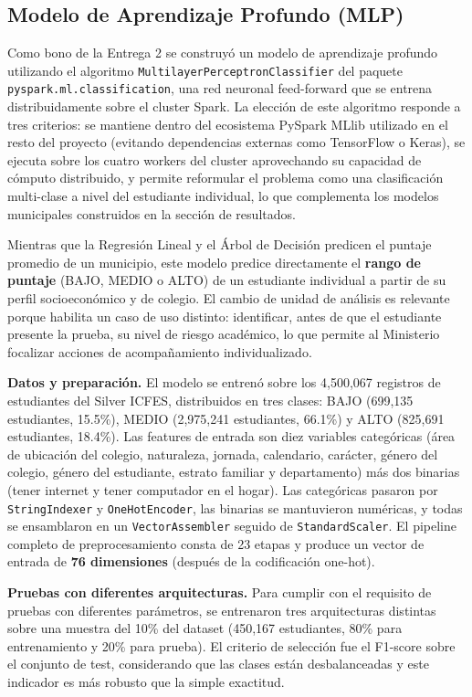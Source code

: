 \subsection{Modelo de Aprendizaje Profundo (MLP)}
Como bono de la Entrega 2 se construyó un modelo de aprendizaje profundo utilizando el algoritmo \texttt{MultilayerPerceptronClassifier} del paquete \texttt{pyspark.ml.classification}, una red neuronal feed-forward que se entrena distribuidamente sobre el cluster Spark. La elección de este algoritmo responde a tres criterios: se mantiene dentro del ecosistema PySpark MLlib utilizado en el resto del proyecto (evitando dependencias externas como TensorFlow o Keras), se ejecuta sobre los cuatro workers del cluster aprovechando su capacidad de cómputo distribuido, y permite reformular el problema como una clasificación multi-clase a nivel del estudiante individual, lo que complementa los modelos municipales construidos en la sección de resultados.

Mientras que la Regresión Lineal y el Árbol de Decisión predicen el puntaje promedio de un municipio, este modelo predice directamente el \textbf{rango de puntaje} (BAJO, MEDIO o ALTO) de un estudiante individual a partir de su perfil socioeconómico y de colegio. El cambio de unidad de análisis es relevante porque habilita un caso de uso distinto: identificar, antes de que el estudiante presente la prueba, su nivel de riesgo académico, lo que permite al Ministerio focalizar acciones de acompañamiento individualizado.

\textbf{Datos y preparación.} El modelo se entrenó sobre los 4,500,067 registros de estudiantes del Silver ICFES, distribuidos en tres clases: BAJO (699,135 estudiantes, 15.5\%), MEDIO (2,975,241 estudiantes, 66.1\%) y ALTO (825,691 estudiantes, 18.4\%). Las features de entrada son diez variables categóricas (área de ubicación del colegio, naturaleza, jornada, calendario, carácter, género del colegio, género del estudiante, estrato familiar y departamento) más dos binarias (tener internet y tener computador en el hogar). Las categóricas pasaron por \texttt{StringIndexer} y \texttt{OneHotEncoder}, las binarias se mantuvieron numéricas, y todas se ensamblaron en un \texttt{VectorAssembler} seguido de \texttt{StandardScaler}. El pipeline completo de preprocesamiento consta de 23 etapas y produce un vector de entrada de \textbf{76 dimensiones} (después de la codificación one-hot).

\textbf{Pruebas con diferentes arquitecturas.} Para cumplir con el requisito de pruebas con diferentes parámetros, se entrenaron tres arquitecturas distintas sobre una muestra del 10\% del dataset (450,167 estudiantes, 80\% para entrenamiento y 20\% para prueba). El criterio de selección fue el F1-score sobre el conjunto de test, considerando que las clases están desbalanceadas y este indicador es más robusto que la simple exactitud.

